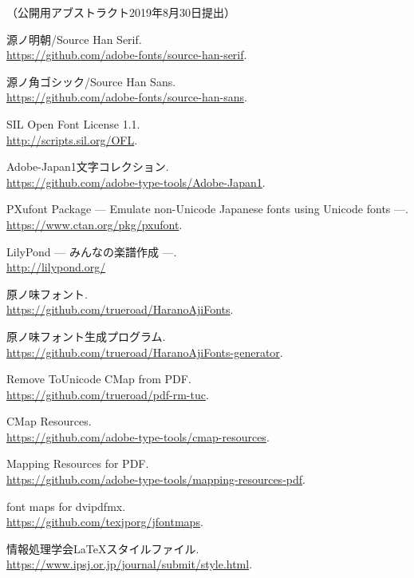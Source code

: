 \begin{flushright}
（公開用アブストラクト2019年8月30日提出）
\end{flushright}

\begin{thebibliography}{99}

 源ノ明朝/Source Han Serif. \\
  \url{https://github.com/adobe-fonts/source-han-serif}.

 源ノ角ゴシック/Source Han Sans. \\
  \url{https://github.com/adobe-fonts/source-han-sans}.

 SIL Open Font License 1.1. \\
  \url{http://scripts.sil.org/OFL}.

 Adobe-Japan1文字コレクション. \\
  \url{https://github.com/adobe-type-tools/Adobe-Japan1}.

 PXufont Package
  --- Emulate non-Unicode Japanese fonts using Unicode fonts ---. \\
  \url{https://www.ctan.org/pkg/pxufont}.

 LilyPond --- みんなの楽譜作成 ---. \\
  \url{http://lilypond.org/}

 原ノ味フォント. \\
  \url{https://github.com/trueroad/HaranoAjiFonts}.

 原ノ味フォント生成プログラム. \\
  \url{https://github.com/trueroad/HaranoAjiFonts-generator}.

 Remove ToUnicode CMap from PDF. \\
  \url{https://github.com/trueroad/pdf-rm-tuc}.

 CMap Resources. \\
  \url{https://github.com/adobe-type-tools/cmap-resources}.

 Mapping Resources for PDF. \\
  \url{https://github.com/adobe-type-tools/mapping-resources-pdf}.

 font maps for dvipdfmx. \\
  \url{https://github.com/texjporg/jfontmaps}.

 情報処理学会\LaTeX スタイルファイル. \\
  \url{https://www.ipsj.or.jp/journal/submit/style.html}.


\end{thebibliography}

